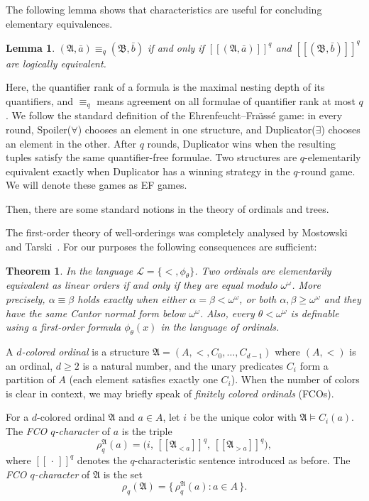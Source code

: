 \documentclass{amsart}
\newtheorem{theorem}{Theorem}
\newtheorem{lemma}{Lemma}
\theoremstyle{definition}
\begin{document}
The following lemma shows that characteristics are useful for concluding elementary equivalences.
\begin{lemma}\label{lem:hintikka}
    $(\mathfrak{A},\bar{a})\equiv_{q}(\mathfrak{B},\bar{b})$ if and only if $[[(\mathfrak{A},\bar{a})]]^q$ and $[[(\mathfrak{B},\bar b)]]^q$ are logically equivalent.
\end{lemma}

Here, the quantifier rank of a formula is the maximal nesting depth of its quantifiers, and $\equiv_q$ means agreement on all formulae of quantifier rank at most $q$. We follow the standard definition of the Ehrenfeucht--Fra\"{\i}ss\'e game: in every round, Spoiler($\forall$) chooses an element in one structure, and Duplicator($\exists$) chooses an element in the other. After $q$ rounds, Duplicator wins when the resulting tuples satisfy the same quantifier-free formulae. Two structures are $q$-elementarily equivalent exactly when Duplicator has a winning strategy in the $q$-round game. We will denote these games as EF games.

Then, there are some standard notions in the theory of ordinals and trees.\label{subsec:babyprelim}

The first‑order theory of well‑orderings was completely analysed by Mostowski and Tarski~\cite{Doner1978}. For our purposes the following consequences are sufficient: 

\begin{theorem}\label{theorem:DMT}
    In the language $\mathcal{L}=\{<, \phi_{\theta}\}$. Two ordinals are elementarily equivalent as linear orders if and only if they are equal modulo $\omega^\omega$. More precisely, $\alpha\equiv\beta$ holds exactly when either $\alpha=\beta<\omega^\omega$, or both $\alpha,\beta\geq\omega^\omega$ and they have the same Cantor normal form below $\omega^\omega$. Also, every $\theta<\omega^\omega$ is definable using a first-order formula $\phi_\theta(x)$ in the language of ordinals.
\end{theorem}

A \emph{$d$-colored ordinal} is a structure $\mathfrak{A}=(A,<,C_0,\dots,C_{d-1})$ where $(A,<)$ is an ordinal, $d\geq 2$ is a natural number, and the unary predicates $C_i$ form a partition of $A$ (each element satisfies exactly one $C_i$). When the number of colors is clear in context, we may briefly speak of \emph{finitely colored ordinals} (FCOs).

For a $d$-colored ordinal $\mathfrak{A}$ and $a\in A$, let $i$ be the unique color with $\mathfrak{A}\models C_i(a)$. The \emph{FCO $q$-character} of $a$ is the triple
$$\rho_q^{\mathfrak{A}}(a)=\bigl(i,\,[[\mathfrak{A}_{<a}]]^{q},\,[[\mathfrak{A}_{>a}]]^{q}\bigr),$$
where $[[\,\cdot\,]]^q$ denotes the $q$-characteristic sentence introduced as before. The \emph{FCO $q$-character} of $\mathfrak{A}$ is the set
$$\rho_q(\mathfrak{A})=\{\,\rho_q^{\mathfrak{A}}(a):a\in A\,\}.$$
\end{document}
